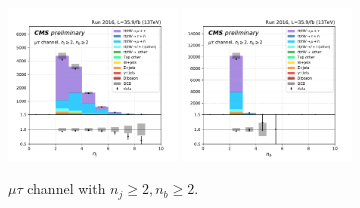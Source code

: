 \begin{figure}[ht]
    \includegraphics[width=0.4\textwidth]{chapters/Analysis/sectionPlots/figures/kinematics_pickles/mutau/2b/mutau_2b_nJets.pdf}
    \includegraphics[width=0.4\textwidth]{chapters/Analysis/sectionPlots/figures/kinematics_pickles/mutau/2b/mutau_2b_nBJets.pdf}
    
    \caption{$\mu\tau$ channel with $n_j\geq2, n_b\geq2$.}
\end{figure}


